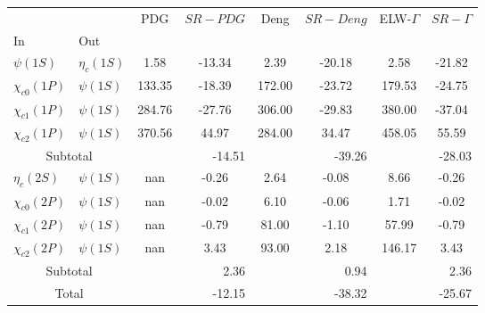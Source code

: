 \begin{tabular}{|l|l|c|c|c|c|c|c|}%
\hline%
&&PDG&$SR-PDG$&Deng&$SR-Deng$&ELW-$\Gamma$&$SR-\Gamma$\\%
In&Out&&&&&&\\%
\hline%
$\psi(1S)$&$\eta_{c}(1S)$&1.58&-13.34&2.39&-20.18&2.58&-21.82\\%
$\chi_{c0}(1P)$&$\psi(1S)$&133.35&-18.39&172.00&-23.72&179.53&-24.75\\%
$\chi_{c1}(1P)$&$\psi(1S)$&284.76&-27.76&306.00&-29.83&380.00&-37.04\\%
$\chi_{c2}(1P)$&$\psi(1S)$&370.56&44.97&284.00&34.47&458.05&55.59\\%
\hline%
\hline%
\multicolumn{2}{|c|}{Subtotal}&\multicolumn{2}{|r|}{{-}14.51}&\multicolumn{2}{|r|}{{-}39.26}&\multicolumn{2}{|r|}{{-}28.03}\\%
\hline%
\hline%
$\eta_{c}(2S)$&$\psi(1S)$&nan&-0.26&2.64&-0.08&8.66&-0.26\\%
$\chi_{c0}(2P)$&$\psi(1S)$&nan&-0.02&6.10&-0.06&1.71&-0.02\\%
$\chi_{c1}(2P)$&$\psi(1S)$&nan&-0.79&81.00&-1.10&57.99&-0.79\\%
$\chi_{c2}(2P)$&$\psi(1S)$&nan&3.43&93.00&2.18&146.17&3.43\\%
\hline%
\hline%
\multicolumn{2}{|c|}{Subtotal}&\multicolumn{2}{|r|}{2.36}&\multicolumn{2}{|r|}{0.94}&\multicolumn{2}{|r|}{2.36}\\%
\hline%
\hline%
\multicolumn{2}{|c|}{Total}&\multicolumn{2}{|r|}{{-}12.15}&\multicolumn{2}{|r|}{{-}38.32}&\multicolumn{2}{|r|}{{-}25.67}\\%
\hline%
\end{tabular}